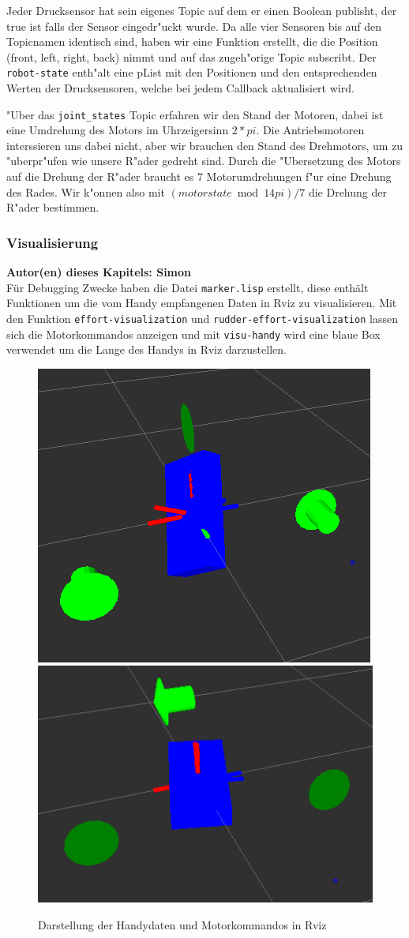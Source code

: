 \documentclass[8pt]{article}
\newcommand{\secauthor}[1]{\textbf{Autor(en) dieses Kapitels: {#1}}\\}
\begin{document}
Jeder Drucksensor hat sein eigenes Topic auf dem er einen Boolean publisht, der true ist falls der Sensor eingedr"uckt wurde. Da alle vier Sensoren bis auf den Topicnamen identisch sind, haben wir eine Funktion erstellt, die die Position (front, left, right, back) nimmt und auf das zugeh"orige Topic subscribt. Der \texttt{robot-state} enth"alt eine pList mit den Positionen und den entsprechenden Werten der Drucksensoren, welche bei jedem Callback aktualisiert wird.

"Uber das \texttt{joint\_states} Topic erfahren wir den Stand der Motoren, dabei ist eine Umdrehung des Motors im Uhrzeigersinn $2*pi$. Die Antriebsmotoren interssieren uns dabei nicht, aber wir brauchen den Stand des Drehmotors, um zu "uberpr"ufen wie unsere R"ader gedreht sind. Durch die "Ubersetzung des Motors auf die Drehung der R"ader braucht es 7 Motorumdrehungen f"ur eine Drehung des Rades. Wir k"onnen also mit 
\( (motorstate \bmod 14pi) / 7 \) die Drehung der R"ader bestimmen.

\subsubsection{Visualisierung} 
\secauthor{Simon}
Für Debugging Zwecke haben die Datei \texttt{marker.lisp} erstellt, diese enthält Funktionen um die vom Handy empfangenen Daten in Rviz zu visualisieren. Mit den Funktion \texttt{effort-visualization} und \texttt{rudder-effort-visualization} lassen sich die Motorkommandos anzeigen und mit \texttt{visu-handy} wird eine blaue Box verwendet um die Lange des Handys in Rviz darzustellen.
\begin{figure}[h]
  \begin{center}
    \includegraphics[width=.4\textwidth]{pictures/rviz2.png}
    \includegraphics[width=.5\textwidth]{pictures/rviz1.png}    
  \end{center}
  \caption{Darstellung der Handydaten und Motorkommandos in Rviz}
  \label{fig:pancake}
\end{figure}
\end{document}
